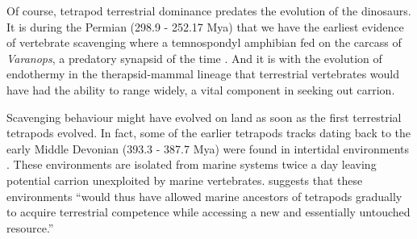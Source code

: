 \documentclass[a4paper,12pt]{article}
\begin{document}
Of course, tetrapod terrestrial dominance predates the evolution of the dinosaurs. %
It is during the Permian (298.9 - 252.17 Mya) %
that we have the earliest evidence of vertebrate scavenging where a temnospondyl amphibian fed on the carcass of \textit{Varanops}, a predatory synapsid of the time \citep{reisz2006articulated}. 
And it is with the evolution of endothermy in the therapsid-mammal lineage \citep{clarke2010temperature} that terrestrial vertebrates would have had the ability to range widely, a vital component in seeking out carrion. 

Scavenging behaviour might have evolved on land as soon as the first terrestrial tetrapods evolved.
In fact, some of the earlier tetrapods tracks dating back to the early Middle Devonian (393.3 - 387.7 Mya) were found in intertidal environments \citep{Niedzwiedzki2009}.
These environments are isolated from marine systems twice a day leaving potential carrion unexploited by marine vertebrates.
\cite{Niedzwiedzki2009} suggests that these environments ``would thus have allowed marine ancestors of tetrapods gradually to acquire terrestrial competence while accessing a new and essentially untouched resource.''
\end{document}
